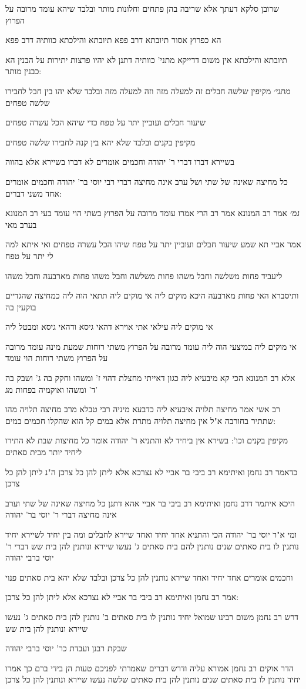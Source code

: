 \documentclass[12pt, openany]{book}
\newcommand{\sethebfont}{
\fontsize{10.5pt}{21.0pt} \selectfont
}
\newcommand{\textblock}[1]{
{\sethebfont #1\\}	
}
\begin{document}
\textblock{שרובן סלקא דעתך אלא שריבה בהן פתחים וחלונות מותר ובלבד שיהא עומד מרובה על הפרוץ}
\textblock{הא כפרוץ אסור תיובתא דרב פפא תיובתא והילכתא כוותיה דרב פפא}
\textblock{תיובתא והילכתא אין משום דדייקא מתני' כוותיה דתנן לא יהיו פרצות יתירות על הבנין הא כבנין מותר:}
\textblock{{\large\emph{מתני׳}} מקיפין שלשה חבלים זה למעלה מזה וזה למעלה מזה ובלבד שלא יהו בין חבל לחבירו שלשה טפחים}
\textblock{שיעור חבלים ועוביין יתר על טפח כדי שיהא הכל עשרה טפחים}
\textblock{מקיפין בקנים ובלבד שלא יהא בין קנה לחבירו שלשה טפחים}
\textblock{בשיירא דברו דברי ר' יהודה וחכמים אומרים לא דברו בשיירא אלא בהווה}
\textblock{כל מחיצה שאינה של שתי ושל ערב אינה מחיצה דברי רבי יוסי בר' יהודה וחכמים אומרים אחד משני דברים:}
\textblock{{\large\emph{גמ׳}} אמר רב המנונא אמר רב הרי אמרו עומד מרובה על הפרוץ בשתי הוי עומד בעי רב המנונא בערב מאי}
\textblock{אמר אביי תא שמע שיעור חבלים ועוביין יתר על טפח שיהו הכל עשרה טפחים ואי איתא למה לי יתר על טפח}
\textblock{ליעביד פחות משלשה וחבל משהו פחות משלשה וחבל משהו פחות מארבעה וחבל משהו}
\textblock{ותיסברא האי פחות מארבעה היכא מוקים ליה אי מוקים ליה תתאי הוה ליה כמחיצה שהגדיים בוקעין בה}
\textblock{אי מוקים ליה עילאי אתי אוירא דהאי גיסא ודהאי גיסא ומבטל ליה}
\textblock{אי מוקים ליה במיצעי הוה ליה עומד מרובה על הפרוץ משתי רוחות שמעת מינה עומד מרובה על הפרוץ משתי רוחות הוי עומד}
\textblock{אלא רב המנונא הכי קא מיבעיא ליה כגון דאייתי מחצלת דהוי ז' ומשהו וחקק בה ג' ושבק בה ד' ומשהו ואוקמיה בפחות מג'}
\textblock{רב אשי אמר מחיצה תלויה איבעיא ליה כדבעא מיניה רבי טבלא מרב מחיצה תלויה מהו שתתיר בחורבה א"ל אין מחיצה תלויה מתרת אלא במים קל הוא שהקלו חכמים במים:}
\textblock{מקיפין בקנים וכו': בשירא אין ביחיד לא והתניא ר' יהודה אומר כל מחיצות שבת לא התירו ליחיד יותר מבית סאתים}
\textblock{כדאמר רב נחמן ואיתימא רב ביבי בר אביי לא נצרכא אלא ליתן להן כל צרכן ה"נ ליתן להן כל צרכן}
\textblock{היכא איתמר דרב נחמן ואיתימא רב ביבי בר אביי אהא דתנן כל מחיצה שאינה של שתי וערב אינה מחיצה דברי ר' יוסי בר' יהודה}
\textblock{ומי א"ר יוסי בר' יהודה הכי והתניא אחד יחיד ואחד שיירא לחבלים ומה בין יחיד לשיירא יחיד נותנין לו בית סאתים שנים נותנין להם בית סאתים ג' נעשו שיירא ונותנין להן בית שש דברי ר' יוסי ברבי יהודה}
\textblock{וחכמים אומרים אחד יחיד ואחד שיירא נותנין להן כל צרכן ובלבד שלא יהא בית סאתים פנוי}
\textblock{אמר רב נחמן ואיתימא רב ביבי בר אביי לא נצרכא אלא ליתן להן כל צרכן:}
\textblock{דרש רב נחמן משום רבינו שמואל יחיד נותנין לו בית סאתים ב' נותנין להן בית סאתים ג' נעשו שיירא ונותנין להן בית שש}
\textblock{שבקת רבנן ועבדת כר' יוסי ברבי יהודה}
\textblock{הדר אוקים רב נחמן אמורא עליה ודרש דברים שאמרתי לפניכם טעות הן בידי ברם כך אמרו יחיד נותנין לו בית סאתים שנים נותנין להן בית סאתים שלשה נעשו שיירא ונותנין להן כל צרכן}
\end{document}
